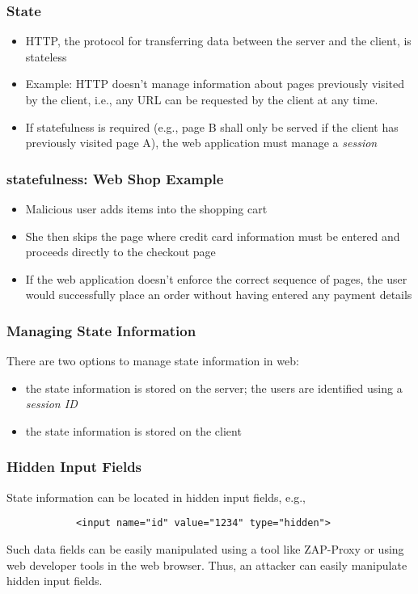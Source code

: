 \begin{frame}
    \frametitle{State}
        \begin{itemize}
        \item HTTP, the protocol for transferring data between the server and the client, is stateless
        \item Example: HTTP doesn't manage information about pages previously visited by the client, i.e., any URL can be requested by the client at any time. 
        \item If statefulness is required (e.g., page B shall only be served if the client has previously visited page A), the web application must manage a \textit{session}
    \end{itemize}
\end{frame}

\begin{frame}
    \frametitle{statefulness: Web Shop Example}
    \begin{itemize}
        \item Malicious user adds items into the shopping cart
        \item She then skips the page where credit card information must be entered and proceeds directly to the checkout page
        \item If the web application doesn't enforce the correct sequence of pages, the user would successfully place an order without having entered any payment details 
    \end{itemize}
\end{frame}

\begin{frame}
    \frametitle{Managing State Information}
    There are two options to manage state information in web:
    \begin{itemize}
        \item the state information is stored on the server; the users are identified using a \textit{session ID}
        \item the state information is stored on the client
    \end{itemize}
\end{frame}

\begin{frame}[fragile]
    \frametitle{Hidden Input Fields}
    State information can be located in hidden input fields, e.g., 
    \begin{center}
        \begin{verbatim}
            <input name="id" value="1234" type="hidden">        
        \end{verbatim}
    \end{center}

    Such data fields can be easily manipulated using a tool like ZAP-Proxy or using web developer tools in the web browser. Thus, an attacker can easily manipulate hidden input fields. 
\end{frame}

